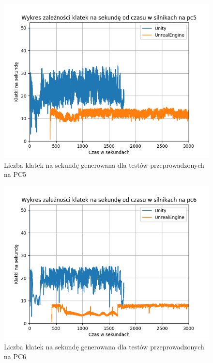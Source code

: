 \documentclass[12pt,twoside]{article}
\begin{document}
\begin{figure}[ht]
    \centering
    \includegraphics[width=16cm]{figures/FPSPlots/pc5searchedDataName.png}
    \caption{Liczba klatek na sekundę generowana dla testów przeprowadzonych na PC5}
    \label{Fig:PC5Tests}
\end{figure}    
\begin{figure}[ht]
    \centering
    \includegraphics[width=16cm]{figures/FPSPlots/pc6searchedDataName.png}
    \caption{Liczba klatek na sekundę generowana dla testów przeprowadzonych na PC6}
    \label{Fig:PC6Tests}
\end{figure}      
\end{document}
